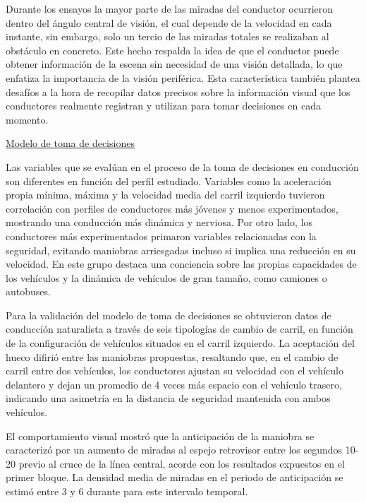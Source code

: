 Durante los ensayos la mayor parte de las miradas del conductor ocurrieron dentro del ángulo central de visión, el cual depende de la velocidad en cada instante, sin embargo, solo un tercio de las miradas totales se realizaban al obstáculo en concreto. Este hecho respalda la idea de que el conductor puede obtener información de la escena sin necesidad de una visión detallada, lo que enfatiza la importancia de la visión periférica. Esta característica también plantea desafíos a la hora de recopilar datos precisos sobre la información visual que los conductores realmente registran y utilizan para tomar decisiones en cada momento.  

\underline{Modelo de toma de decisiones}

Las variables que se evalúan en el proceso de la toma de decisiones en conducción son diferentes en función del perfil estudiado. Variables como la aceleración propia mínima, máxima y la velocidad media del carril izquierdo tuvieron correlación con perfiles de conductores más jóvenes y menos experimentados, mostrando una conducción más dinámica y nerviosa. Por otro lado, los conductores más experimentados primaron variables relacionadas con la seguridad, evitando maniobras arriesgadas incluso si implica una reducción en su velocidad. En este grupo destaca una conciencia sobre las propias capacidades de los vehículos y la dinámica de vehículos de gran tamaño, como camiones o autobuses.  

Para la validación del modelo de toma de decisiones se obtuvieron datos de conducción naturalista a través de seis tipologías de cambio de carril, en función de la configuración de vehículos situados en el carril izquierdo. La aceptación del hueco difirió entre las maniobras propuestas, resaltando que, en el cambio de carril entre dos vehículos, los conductores ajustan su velocidad con el vehículo delantero y dejan un promedio de 4 veces más espacio con el vehículo trasero, indicando una asimetría en la distancia de seguridad mantenida con ambos vehículos. 

El comportamiento visual mostró que la anticipación de la maniobra se caracterizó por un aumento de miradas al espejo retrovisor entre los segundos 10-20 previo al cruce de la línea central, acorde con los resultados expuestos en el primer bloque. La densidad media de miradas en el periodo de anticipación se estimó entre 3 y 6 durante para este intervalo temporal.  

